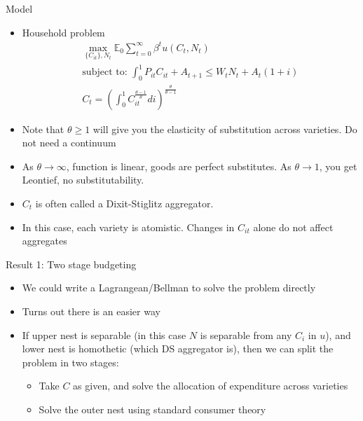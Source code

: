 \documentclass[11pt,aspectratio=169,xcolor={dvipsnames},hyperref={pdftex,pdfpagemode=UseNone,hidelinks,pdfdisplaydoctitle=true},usepdftitle=false]{beamer}
\begin{document}
\begin{frame}{Model}
\begin{itemize}
\item Household problem
\begin{align*}
\max_{\{C_{it}\},N_t } \mathbb{E}_0 \sum_{t=0}^{\infty} \beta^t u(C_t,N_t)\\
\text{subject to:   } \int_0^1 P_{it} C_{it} + A_{t+1} \leq W_t N_t +  A_t(1+i)\\
C_t = \left(\int_0^1 C^{\frac{\theta-1}{\theta}}_{it} di \right)^{\frac{\theta}{\theta-1}}
\end{align*}
\item Note that $\theta \geq 1$ will give you the elasticity of substitution across varieties. Do not need a continuum
\item As $\theta \rightarrow \infty$, function is linear, goods are perfect substitutes. As $\theta \rightarrow 1$, you get Leontief, no substitutability.
\item $C_t$ is often called a Dixit-Stiglitz aggregator. 
\item In this case, each variety is atomistic. Changes in $C_{it}$ alone do not affect aggregates
\end{itemize}
\end{frame}


\begin{frame}{Result 1: Two stage budgeting}
\begin{itemize}
\item We could write a Lagrangean/Bellman to solve the problem directly
\item Turns out there is an easier way
\item If upper nest is separable (in this case $N$ is separable from any $C_{i}$ in $u$), and lower nest is homothetic (which DS aggregator is), then we can split the problem in two stages:
\begin{itemize}
\item Take $C$ as given, and solve the allocation of expenditure across varieties
\item Solve the outer nest using standard consumer theory
\end{itemize}
\end{itemize}
\end{frame}
\end{document}

